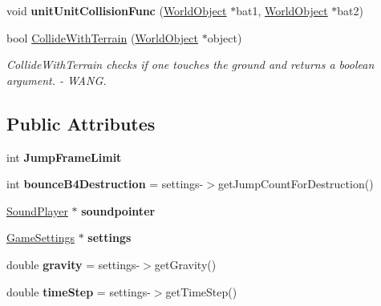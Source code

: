 \begin{DoxyCompactItemize}
\item 
void {\bfseries unit\+Unit\+Collision\+Func} (\hyperlink{class_world_object}{World\+Object} $\ast$bat1, \hyperlink{class_world_object}{World\+Object} $\ast$bat2)\hypertarget{class_physics_calc_aacab28a38556f2a29e52068f09a3a4f0}{}\label{class_physics_calc_aacab28a38556f2a29e52068f09a3a4f0}

\item 
bool \hyperlink{class_physics_calc_a88dc6d26563c0a340cd5c4470801b419}{Collide\+With\+Terrain} (\hyperlink{class_world_object}{World\+Object} $\ast$object)\hypertarget{class_physics_calc_a88dc6d26563c0a340cd5c4470801b419}{}\label{class_physics_calc_a88dc6d26563c0a340cd5c4470801b419}

\begin{DoxyCompactList}\small\item\em Collide\+With\+Terrain checks if one touches the ground and returns a boolean argument. -\/ W\+A\+NG. \end{DoxyCompactList}\end{DoxyCompactItemize}
\subsection*{Public Attributes}
\begin{DoxyCompactItemize}
\item 
int {\bfseries Jump\+Frame\+Limit}\hypertarget{class_physics_calc_a72b7108e3e2f8cd8fb709849dbb2506c}{}\label{class_physics_calc_a72b7108e3e2f8cd8fb709849dbb2506c}

\item 
int {\bfseries bounce\+B4\+Destruction} = settings-\/$>$get\+Jump\+Count\+For\+Destruction()\hypertarget{class_physics_calc_a774c280f0c153e3a879d51f10091800a}{}\label{class_physics_calc_a774c280f0c153e3a879d51f10091800a}

\item 
\hyperlink{class_sound_player}{Sound\+Player} $\ast$ {\bfseries soundpointer}\hypertarget{class_physics_calc_aa292db7cbe605b0b7cb95a0548afcd29}{}\label{class_physics_calc_aa292db7cbe605b0b7cb95a0548afcd29}

\item 
\hyperlink{class_game_settings}{Game\+Settings} $\ast$ {\bfseries settings}\hypertarget{class_physics_calc_ace492cdc5b24e04044d0ed249917d93e}{}\label{class_physics_calc_ace492cdc5b24e04044d0ed249917d93e}

\item 
double {\bfseries gravity} = settings-\/$>$get\+Gravity()\hypertarget{class_physics_calc_ab941acb0b7803cb4dd1bc60fd3381043}{}\label{class_physics_calc_ab941acb0b7803cb4dd1bc60fd3381043}

\item 
double {\bfseries time\+Step} = settings-\/$>$get\+Time\+Step()\hypertarget{class_physics_calc_aeb23b46816202fed3cab9aa0d852f6a9}{}\label{class_physics_calc_aeb23b46816202fed3cab9aa0d852f6a9}

\end{DoxyCompactItemize}


